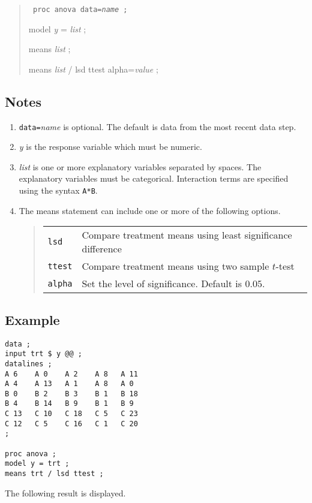 \documentclass[12pt]{article}
\begin{document}
\begin{quote}
{\tt
proc anova data={\it name} ;

model {\it y} = {\it list} ;

means {\it list} ;

means {\it list} / lsd ttest alpha={\it value} ;
}
\end{quote}

\subsection*{Notes}

\begin{enumerate}
\item
{\tt data=}{\it name} is optional.
The default is data from the most recent data step.
\item
{\it y} is the response variable which must be numeric.
\item
{\it list} is one or more explanatory variables separated by spaces.
The explanatory variables must be categorical.
Interaction terms are specified using the syntax {\tt A*B}.
\item
The means statement can include one or more of the following options.
\begin{quote}
\begin{tabular}{ll}
{\tt lsd} & Compare treatment means using least significance difference \\
{\tt ttest} & Compare treatment means using two sample $t$-test \\
{\tt alpha} & Set the level of significance. Default is $0.05$.
\end{tabular}
\end{quote}
\end{enumerate}

\subsection*{Example}

{\scriptsize\begin{verbatim}
data ;
input trt $ y @@ ;
datalines ;
A 6    A 0    A 2    A 8   A 11
A 4    A 13   A 1    A 8   A 0
B 0    B 2    B 3    B 1   B 18
B 4    B 14   B 9    B 1   B 9
C 13   C 10   C 18   C 5   C 23
C 12   C 5    C 16   C 1   C 20
;

proc anova ;
model y = trt ;
means trt / lsd ttest ;
\end{verbatim}}

The following result is displayed.
\end{document}
